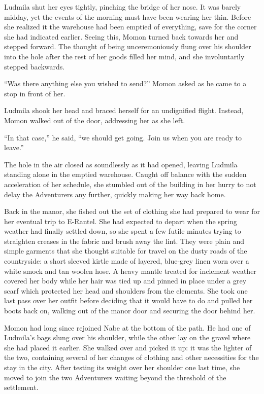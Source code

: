  

Ludmila shut her eyes tightly, pinching the bridge of her nose. It was barely midday, yet the events of the morning must have been wearing her thin. Before she realized it the warehouse had been emptied of everything, save for the corner she had indicated earlier. Seeing this, Momon turned back towards her and stepped forward. The thought of being unceremoniously flung over his shoulder into the hole after the rest of her goods filled her mind, and she involuntarily stepped backwards.

 

“Was there anything else you wished to send?” Momon asked as he came to a stop in front of her.

 

Ludmila shook her head and braced herself for an undignified flight. Instead, Momon walked out of the door, addressing her as she left.

 

“In that case,” he said, “we should get going. Join us when you are ready to leave.”

 

The hole in the air closed as soundlessly as it had opened, leaving Ludmila standing alone in the emptied warehouse. Caught off balance with the sudden acceleration of her schedule, she stumbled out of the building in her hurry to not delay the Adventurers any further, quickly making her way back home.

 

Back in the manor, she fished out the set of clothing she had prepared to wear for her eventual trip to E-Rantel. She had expected to depart when the spring weather had finally settled down, so she spent a few futile minutes trying to straighten creases in the fabric and brush away the lint. They were plain and simple garments that she thought suitable for travel on the dusty roads of the countryside: a short sleeved kirtle made of layered, blue-grey linen worn over a white smock and tan woolen hose. A heavy mantle treated for inclement weather covered her body while her hair was tied up and pinned in place under a grey scarf which protected her head and shoulders from the elements. She took one last pass over her outfit before deciding that it would have to do and pulled her boots back on, walking out of the manor door and securing the door behind her.

 

Momon had long since rejoined Nabe at the bottom of the path. He had one of Ludmila’s bags slung over his shoulder, while the other lay on the gravel where she had placed it earlier. She walked over and picked it up: it was the lighter of the two, containing several of her changes of clothing and other necessities for the stay in the city. After testing its weight over her shoulder one last time, she moved to join the two Adventurers waiting beyond the threshold of the settlement.

